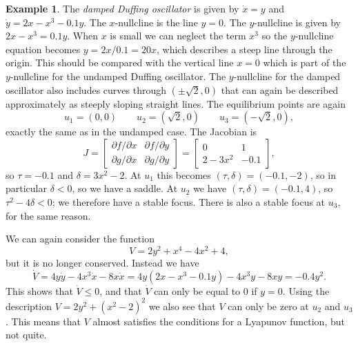 \documentclass[reqno]{amsart}
\theoremstyle{definition}
\newtheorem{example}[theorem]{Example}
\begin{document}
\begin{example}\label{eg-damped-duffing}
 The \emph{damped Duffing oscillator} is given by $\dot{x}=y$ and
 $\dot{y}=2x-x^3-0.1y$.   The $x$-nullcline is the line $y=0$.  The
 $y$-nullcline is given by $2x-x^3=0.1y$.  When $x$ is small we can
 neglect the term $x^3$ so the $y$-nullcline equation becomes
 $y=2x/0.1=20x$, which describes a steep line through the origin.
 This should be compared with the vertical line $x=0$ which is part of
 the $y$-nullcline for the undamped Duffing oscillator.  The
 $y$-nullcline for the damped oscillator also includes curves through
 $(\pm\sqrt{2},0)$ that can again be described approximately as
 steeply sloping straight lines.  The equilibrium points are again 
 \[ u_1 = (0,0) \qquad u_2 = (\sqrt{2},0) \qquad u_3 = (-\sqrt{2},0), 
 \]
 exactly the same as in the undamped case.  The Jacobian is 
 \[ J = \left[\begin{array}{cc} \partial f/\partial x & \partial f/\partial y \\
             \partial g/\partial x & \partial g/\partial y \end{array}\right]
      = \left[\begin{array}{cc} 0 & 1 \\
             2-3x^2 & -0.1 \end{array}\right],
 \]
 so $\tau=-0.1$ and $\delta=3x^2-2$.  At $u_1$ this becomes
 $(\tau,\delta)=(-0.1,-2)$, so in particular $\delta<0$, so we have a
 saddle.  At $u_2$ we have $(\tau,\delta)=(-0.1,4)$, so $\tau^2-4\delta<0$;
 we therefore have a stable focus.  There is also a stable focus at
 $u_3$, for the same reason.

 We can again consider the function 
 \[ V = 2y^2+x^4-4x^2+4, \]
 but it is no longer conserved.  Instead we have 
 \[ \dot{V} = 4y\dot{y} - 4x^3\dot{x}-8x\dot{x} 
            = 4y(2x-x^3-0.1y)-4x^3y-8xy = -0.4y^2. 
 \]
 This shows that $\dot{V}\leq 0$, and that $\dot{V}$ can only be equal
 to $0$ if $y=0$.  Using the description $V=2y^2+(x^2-2)^2$ we also
 see that $V$ can only be zero at $u_2$ and $u_3$.  This means that
 $V$ almost satisfies the conditions for a Lyapunov function, but not
 quite.  


\end{example}
\end{document}
